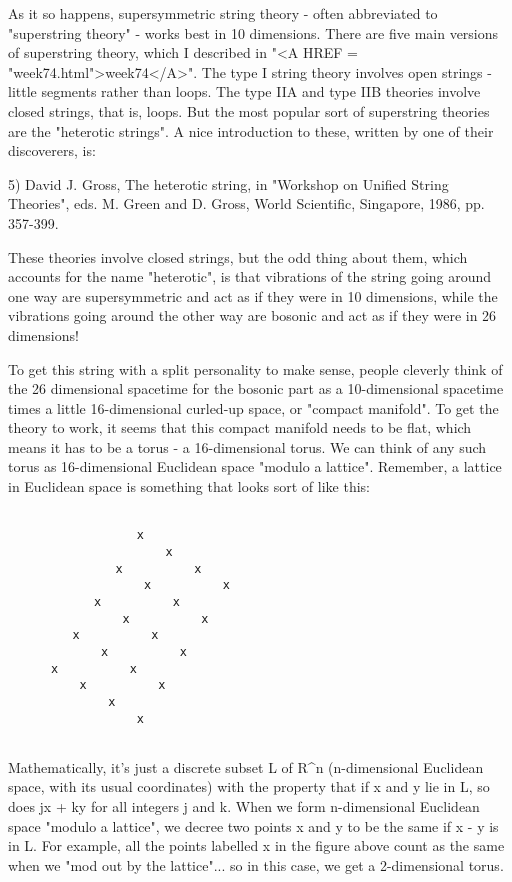 As it so happens, supersymmetric string theory - often abbreviated
to "superstring theory" - works best in 10 dimensions.  There are 
five main versions of superstring theory, which I described in 
"<A HREF = "week74.html">week74</A>".  The type I string theory involves open strings - little
segments rather than loops.  The type IIA and type IIB theories
involve closed strings, that is, loops.   But the most popular sort
of superstring theories are the "heterotic strings".  A nice 
introduction to these, written by one of their discoverers, is:

5) David J. Gross, The heterotic string, in "Workshop on Unified 
String Theories", eds. M. Green and D. Gross, World Scientific, 
Singapore, 1986, pp. 357-399.  

These theories involve closed strings, but the odd thing about 
them, which accounts for the name "heterotic", is that vibrations 
of the string going around one way are supersymmetric and act as 
if they were in 10 dimensions, while the vibrations going around
the other way are bosonic and act as if they were in 26 dimensions!

To get this string with a split personality to make sense, people 
cleverly think of the 26 dimensional spacetime for the bosonic part 
as a 10-dimensional spacetime times a little 16-dimensional curled-up 
space, or "compact manifold".  To get the theory to work, it seems that
this compact manifold needs to be flat, which means it has to be a 
torus - a 16-dimensional torus.  We can think of any such torus as
16-dimensional Euclidean space "modulo a lattice".  Remember, a lattice
in Euclidean space is something that looks sort of like this:


\begin{verbatim}

                  x
                      x
               x          x
                   x          x 
            x          x
                x          x
         x          x
             x          x
      x          x   
          x          x
              x 
                  x


\end{verbatim}
    
Mathematically, it's just a discrete subset L of R^{n} (n-dimensional
Euclidean space, with its usual coordinates) with the property that 
if x and y lie in L, so does jx + ky for all integers j and k.  When 
we form n-dimensional Euclidean space "modulo a lattice", we decree 
two points x and y to be the same if x - y is in L.   For example, 
all the points labelled x in the figure above count as the same 
when we "mod out by the lattice"... so in this case, we get a 
2-dimensional torus.  

